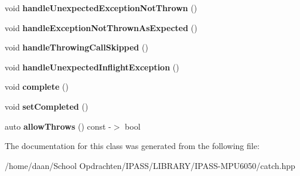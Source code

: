\begin{DoxyCompactItemize}
void {\bfseries handle\+Unexpected\+Exception\+Not\+Thrown} ()
\item 
\mbox{\label{classCatch_1_1AssertionHandler_a51e4936e3af43b74690cedae6d2e297a}} 
void {\bfseries handle\+Exception\+Not\+Thrown\+As\+Expected} ()
\item 
\mbox{\label{classCatch_1_1AssertionHandler_a67a194d5518f307c4a16faa03a7f7442}} 
void {\bfseries handle\+Throwing\+Call\+Skipped} ()
\item 
\mbox{\label{classCatch_1_1AssertionHandler_aa2504dad6a91f3645e5f52c932c11270}} 
void {\bfseries handle\+Unexpected\+Inflight\+Exception} ()
\item 
\mbox{\label{classCatch_1_1AssertionHandler_a878a9eb828d8a1863c8dcb6575f6f40e}} 
void {\bfseries complete} ()
\item 
\mbox{\label{classCatch_1_1AssertionHandler_a6756bd5395c0ddd28764a9fb4612d5e4}} 
void {\bfseries set\+Completed} ()
\item 
\mbox{\label{classCatch_1_1AssertionHandler_a193bb3999494c46457f3059184c6b251}} 
auto {\bfseries allow\+Throws} () const -\/$>$ bool
\end{DoxyCompactItemize}


The documentation for this class was generated from the following file\+:\begin{DoxyCompactItemize}
\item 
/home/daan/\+School Opdrachten/\+I\+P\+A\+S\+S/\+L\+I\+B\+R\+A\+R\+Y/\+I\+P\+A\+S\+S-\/\+M\+P\+U6050/catch.\+hpp\end{DoxyCompactItemize}
